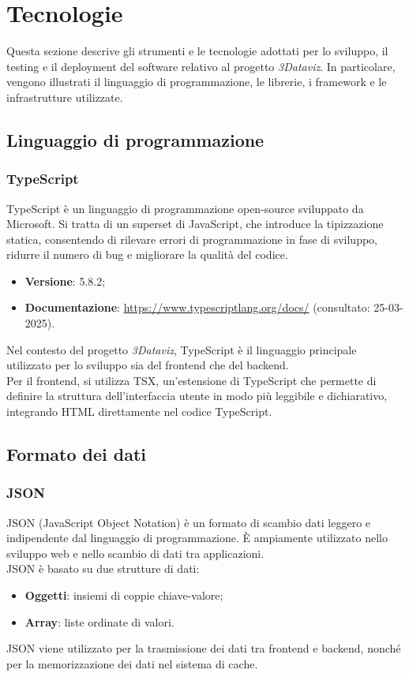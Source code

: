 \section{Tecnologie}
Questa sezione descrive gli strumenti e le tecnologie adottati per lo sviluppo,
il testing e il deployment del software relativo al progetto \textit{3Dataviz}.
In particolare, vengono illustrati il linguaggio di programmazione, le
librerie, i framework e le infrastrutture utilizzate.

\subsection{Linguaggio di programmazione}
\subsubsection{TypeScript}
TypeScript è un linguaggio di programmazione open-source sviluppato da
Microsoft. Si tratta di un superset di JavaScript, che introduce la
tipizzazione statica, consentendo di rilevare errori di programmazione in fase
di sviluppo, ridurre il numero di bug e migliorare la qualità del codice.
\begin{itemize}
    \item \textbf{Versione}: 5.8.2;
    \item \textbf{Documentazione}: \url{https://www.typescriptlang.org/docs/} (consultato:
          25-03-2025).
\end{itemize}
Nel contesto del progetto \textit{3Dataviz}, TypeScript è il linguaggio principale
utilizzato per lo sviluppo sia del frontend che del backend. \\Per il frontend,
si utilizza TSX, un'estensione di TypeScript che permette di definire la struttura
dell'interfaccia utente in modo più leggibile e dichiarativo, integrando HTML
direttamente nel codice TypeScript.

\subsection{Formato dei dati}
\subsubsection{JSON}
JSON (JavaScript Object Notation) è un formato di scambio dati leggero e
indipendente dal linguaggio di programmazione. È ampiamente utilizzato nello
sviluppo web e nello scambio di dati tra applicazioni. \\JSON è basato su due
strutture di dati:
\begin{itemize}
    \item \textbf{Oggetti}: insiemi di coppie chiave-valore;
    \item \textbf{Array}: liste ordinate di valori.
\end{itemize}
JSON viene utilizzato per la trasmissione dei dati tra frontend e backend, nonché
per la memorizzazione dei dati nel sistema di cache.

